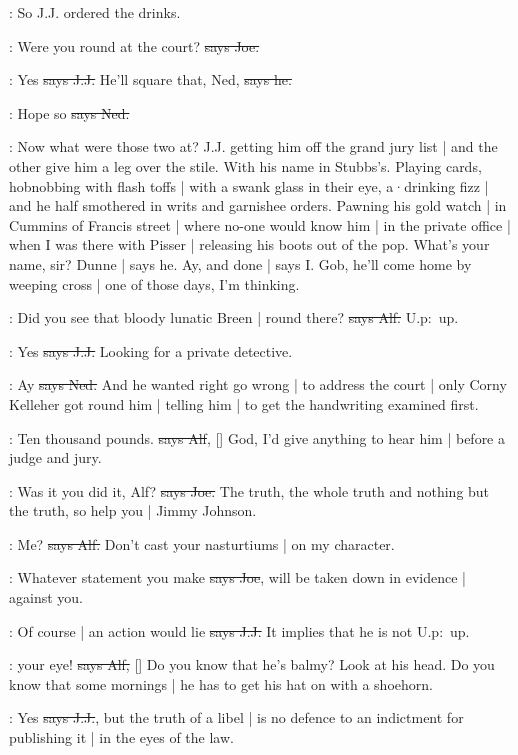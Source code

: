 \Nq:
So J.J. ordered the drinks.

\joe:
Were you round at the court?
\sout{says Joe.}

\jjom:
Yes
\sout{says J.J.}
He'll square that,
Ned,
\sout{says he.}

\lambert:
Hope so
\sout{says Ned.}

\Nq:
Now what were those two at?
J.J. getting him off the grand jury list |
and the other give him a leg over the stile.
With his name in Stubbs's.
Playing cards,
hobnobbing with flash toffs |
with a swank glass in their eye,
a·drinking fizz |
and he half smothered in writs and garnishee orders.
Pawning his gold watch |
in Cummins of Francis street |
where no-one would know him |
in the private office |
when I was there with Pisser |
releasing his boots out of the pop.
What's your name,
sir?
Dunne |
says he.
Ay,
and done |
says I.
Gob,
he'll come home by weeping cross |
one of those days,
I'm thinking.%

\bergan:
Did you see that bloody lunatic Breen |
round there?
\sout{says Alf.}
U.p:~up.

\jjom:
Yes
\sout{says J.J.}
Looking for a private detective.

\lambert:
Ay
\sout{says Ned.}
And he wanted right go wrong |
to address the court |
only Corny Kelleher got round him |
telling him |
to get the handwriting examined first.

\bergan:
Ten thousand pounds.
\sout{says Alf},
[]
God,
I'd give anything to hear him |
before a judge and jury.

\joe:
Was it you did it,
Alf?
\sout{says Joe.}
The truth,
the whole truth and nothing but the truth,
so help you |
Jimmy Johnson.

\bergan:
Me?
\sout{says Alf.}
Don't cast your nasturtiums |
on my character.

\joe:
Whatever statement you make
\sout{says Joe},
will be taken down in evidence |
against you.

\jjom:
Of course |
an action would lie
\sout{says J.J.}
It implies that he is not 
U.p:~up.

\bergan:
 your eye!
\sout{says Alf,}
[]
Do you know that he's balmy?
Look at his head.
Do you know that some mornings |
he has to get his hat on with a shoehorn.

\jjom:
Yes
\sout{says J.J.},
but the truth of a libel |
is no defence to an indictment for publishing it |
in the eyes of the law.


